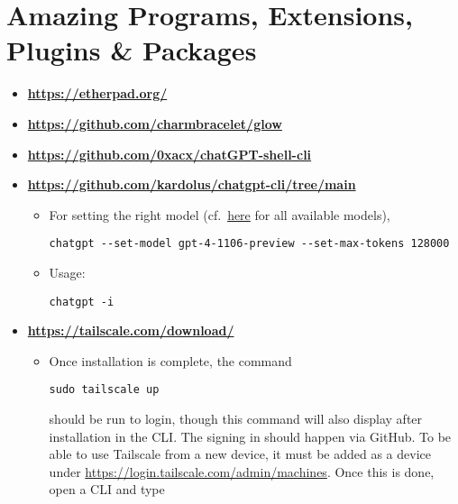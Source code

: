 \documentclass[12pt, a4paper]{scrbook}
\numberwithin{equation}{section}
\theoremstyle{definition}
\theoremstyle{definition}
\begin{document}
\chapter{Amazing Programs, Extensions, Plugins \& Packages}

	\begin{itemize}
		\item \textbf{\url{https://etherpad.org/}}

		\item \textbf{\url{https://github.com/charmbracelet/glow}}
		
		\item \textbf{\url{https://github.com/0xacx/chatGPT-shell-cli}}
		
		\item \textbf{\url{https://github.com/kardolus/chatgpt-cli/tree/main}}	
		
		\begin{itemize}
			\item For setting the right model (cf.~\href{https://platform.openai.com/docs/models/gpt-4-and-gpt-4-turbo}{here} for all available models), 
			
			\begin{lstlisting}[style=mystylebash, label=alg:chatgpt_set_model, xleftmargin=\parindent]
				chatgpt --set-model gpt-4-1106-preview --set-max-tokens 128000
			\end{lstlisting}

			\item Usage:

			\begin{lstlisting}[style=mystylebash, label=alg:chatgpt_usage, xleftmargin=\parindent]
				chatgpt -i
			\end{lstlisting}
		\end{itemize}

		\item \textbf{\url{https://tailscale.com/download/}}
		
		\begin{itemize}
			\item Once installation is complete, the command 
			
			\begin{lstlisting}[style=mystylepython, label=alg:tailscale_login, xleftmargin=\parindent]
				sudo tailscale up
			\end{lstlisting}
		
			should be run to login, though this command will also display after installation in the CLI. The signing in should happen via GitHub. To be able to use Tailscale from a new device, it must be added as a device under \url{https://login.tailscale.com/admin/machines}. Once this is done, open a CLI and type 
			

\end{itemize}
\end{itemize}
\end{document}
